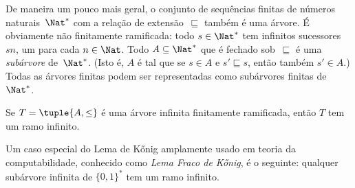 \documentclass[../../../include/open-logic-section]{subfiles}
\begin{document}
\begin{ex}
De maneira um pouco mais geral, o conjunto de sequências finitas de números naturais~$\Nat^*$ com a relação de extensão~$\sqsubseteq$ também é uma
árvore. É obviamente não finitamente ramificada: todo $s \in \Nat^*$ tem
infinitos sucessores~$sn$, um para cada $n \in \Nat$. Todo $A
\subseteq \Nat^*$ que é fechado sob~$\sqsubseteq$ é uma
\emph{subárvore} de~$\Nat^*$. (Isto é, $A$ é tal que se $s \in A$
e $s' \sqsubseteq s$, então também $s' \in A$.) Todas as árvores finitas podem ser
representadas como subárvores finitas de~$\Nat^*$.
\end{ex}

\begin{prop}
Se $T = \tuple{A,\le}$ é uma árvore infinita finitamente ramificada,
então $T$ tem um ramo infinito.
\end{prop}

Um caso especial do Lema de K\H{o}nig amplamente usado em teoria da
computabilidade, conhecido como \emph{Lema Fraco de K\H{o}nig}, é o seguinte: qualquer
subárvore infinita de $\{0,1\}^*$ tem um ramo infinito.
\end{document}
